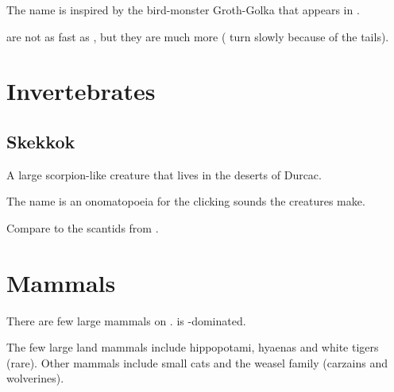 The name is inspired by the bird-monster Groth-Golka that appears in . 

\Grulcans{} are not as fast as , but they are much more \manoeuvrable (\relcs{} turn slowly because of the tails). 















\section{Invertebrates}









\subsection{Skekkok}
A large scorpion-like creature that lives in the deserts of Durcac. 

The name is an onomatopoeia for the clicking sounds the creatures make.

Compare to the scantids from \cite{VideoGame:Starcraft}. 















\section{Mammals}
There are few large mammals on \Miith. 
\Miith{} is \saurian-dominated. 

The few large land mammals include hippopotami, hyaenas and white tigers (rare). 
Other mammals include small cats and the weasel family (carzains and wolverines). 









